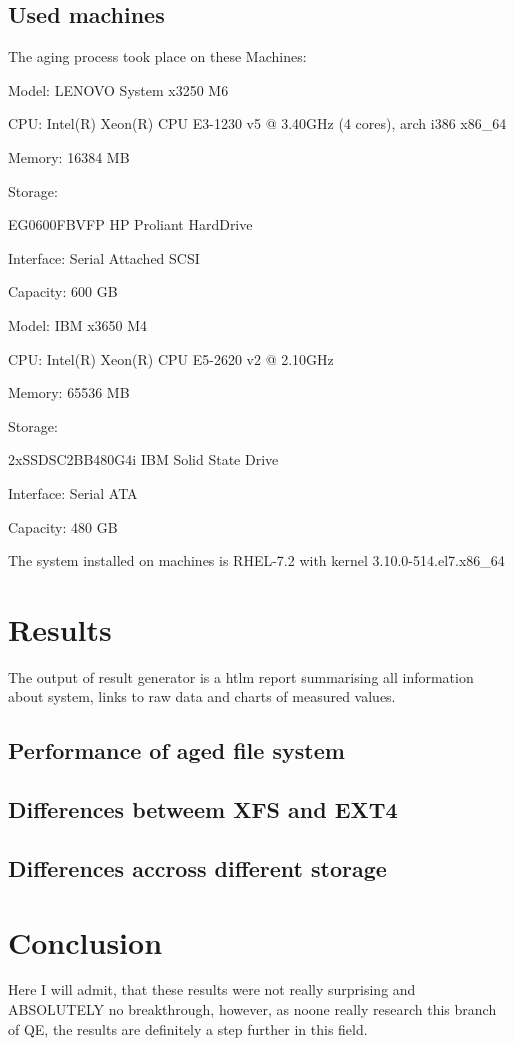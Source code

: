 \documentclass[
  color, %
  table, %
  lof,   %
  lot,   %
]{fithesis3}
\begin{document}
\section{Used machines}
The aging process took place on these Machines:
\begin{compactenum}
  \item Model: LENOVO System x3250 M6
  \item CPU: Intel(R) Xeon(R) CPU E3-1230 v5 @ 3.40GHz (4 cores), arch i386 x86\_64 
  \item Memory: 16384 MB
  \item Storage: 
  \begin{compactenum}
	\item EG0600FBVFP HP Proliant HardDrive
	\item Interface: Serial Attached SCSI
	\item Capacity: 600 GB
	\end{compactenum}
\end{compactenum}  


\begin{compactenum}
  \item Model: IBM x3650 M4
  \item CPU: Intel(R) Xeon(R) CPU E5-2620 v2 @ 2.10GHz 
  \item Memory: 65536 MB
  \item Storage:
  \begin{compactenum}
	\item 2xSSDSC2BB480G4i IBM Solid State Drive
	\item Interface: Serial ATA
	\item Capacity: 480 GB
	\end{compactenum}
\end{compactenum}


The system installed on machines is RHEL-7.2 with kernel 3.10.0-514.el7.x86\_64 

\chapter{Results}
The output of result generator is a htlm report summarising all information about system, links to raw data and charts of measured values.

\section{Performance of aged file system}
\section{Differences betweem XFS and EXT4}
\section{Differences accross different storage}
\chapter{Conclusion}
Here I will admit, that these results were not really surprising and ABSOLUTELY no breakthrough, however, as noone really research this branch of QE, the results are definitely a step further in this field.

\printbibliography
\end{document}
